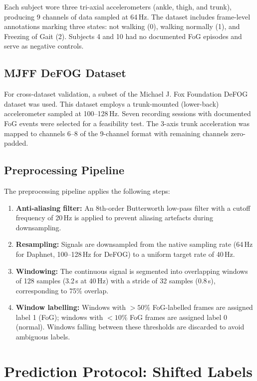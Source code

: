 \documentclass[12pt,a4paper,oneside]{report}
\numberwithin{equation}{chapter}
\numberwithin{figure}{chapter}
\numberwithin{table}{chapter}
\begin{document}
Each subject wore three tri-axial accelerometers (ankle, thigh, and trunk), producing 9 channels of data sampled at 64\,Hz. The dataset includes frame-level annotations marking three states: not walking (0), walking normally (1), and Freezing of Gait (2). Subjects 4 and 10 had no documented FoG episodes and serve as negative controls.

\subsection{MJFF DeFOG Dataset}

For cross-dataset validation, a subset of the Michael J. Fox Foundation DeFOG dataset was used. This dataset employs a trunk-mounted (lower-back) accelerometer sampled at 100--128\,Hz. Seven recording sessions with documented FoG events were selected for a feasibility test. The 3-axis trunk acceleration was mapped to channels 6--8 of the 9-channel format with remaining channels zero-padded.

\subsection{Preprocessing Pipeline}

The preprocessing pipeline applies the following steps:

\begin{enumerate}[leftmargin=*, itemsep=3pt]
  \item \textbf{Anti-aliasing filter:} An 8th-order Butterworth low-pass filter with a cutoff frequency of 20\,Hz is applied to prevent aliasing artefacts during downsampling.
  \item \textbf{Resampling:} Signals are downsampled from the native sampling rate (64\,Hz for Daphnet, 100--128\,Hz for DeFOG) to a uniform target rate of 40\,Hz.
  \item \textbf{Windowing:} The continuous signal is segmented into overlapping windows of 128 samples (3.2\,s at 40\,Hz) with a stride of 32 samples (0.8\,s), corresponding to 75\% overlap.
  \item \textbf{Window labelling:} Windows with $>50\%$ FoG-labelled frames are assigned label 1 (FoG); windows with $<10\%$ FoG frames are assigned label 0 (normal). Windows falling between these thresholds are discarded to avoid ambiguous labels.
\end{enumerate}

\section{Prediction Protocol: Shifted Labels}
\end{document}
